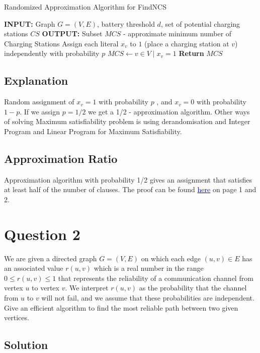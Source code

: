 \documentclass[11pt]{article}
\begin{document}
\begin{algorithm}
    \caption{Randomized Approximation Algorithm for FindNCS}
    \begin{algorithmic}[1]
        \STATE \textbf{INPUT: } Graph $G = (V, E)$, battery threshold $d$, set of potential charging stations $CS$
        \STATE \textbf{OUTPUT: } Subset $MCS$ - approximate minimum number of Charging Stations
        \STATE Assign each literal $x_v$ to $1$ (place a charging station at $v$) independently with probability $p$
        \STATE $MCS \leftarrow { v \in V \mid x_v = 1 }$
        \STATE \textbf{Return} $MCS$
    \end{algorithmic}
\end{algorithm}

\subsection*{Explanation}
Random assignment of $x_v = 1$  with probability $p$ , and $x_v = 0$  with probability $1 - p$. If we assign $p = 1/2$ we get a 1/2 - approximation algorithm. Other ways of solving Maximum satisfiability problem is using derandomisation and Integer Program and Linear Program for Maximum Satisfiability. 

\subsection*{Approximation Ratio}
Approximation algorithm with probability 1/2 gives an assignment that satisfies at least half of the number of clauses. The proof can be found \href{https://www.cse.iitb.ac.in/~rgurjar/CS602_2020/LectureNotes/lec19-2.pdf}{\textcolor{blue}{here}} on page 1 and 2.

\section*{Question 2}
We are given a directed graph \( G = (V, E) \) on which each edge \( (u, v) \in E \) has an associated value \( r(u, v) \) which is a real number in the range \( 0 \leq r(u, v) \leq 1 \) that represents the reliability of a communication channel from vertex \( u \) to vertex \( v \). We interpret \( r(u, v) \) as the probability that the channel from \( u \) to \( v \) will not fail, and we assume that these probabilities are independent. Give an efficient algorithm to find the most reliable path
between two given vertices.

\subsection*{Solution}
\end{document}

